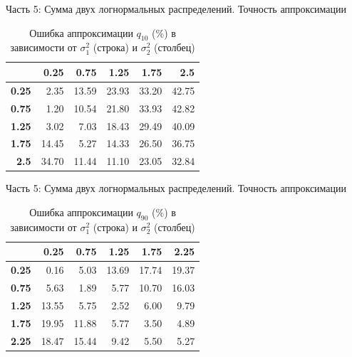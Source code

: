 \documentclass[ucs, notheorems, handout]{beamer}
\begin{document}
	\begin{frame}{Часть 5: Сумма двух логнормальных распределений. Точность аппроксимации}
		\begin{table}[ht]
			\centering
			\caption{Ошибка аппроксимации $q_{10}$ ($\%$) в зависимости от $\sigma_{1}^{2}$ (строка) и $\sigma_{2}^{2}$ (столбец)}
			\begin{tabular}{rrrrrr}
				\hline
				& \textbf{0.25} & \textbf{0.75} & \textbf{1.25} & \textbf{1.75} & \textbf{2.5} \\
				\hline
				\textbf{0.25} & 2.35 & 13.59 & 23.93 & 33.20 & 42.75 \\ 
				\textbf{0.75} & 1.20 & 10.54 & 21.80 & 33.93 & 42.82 \\ 
				\textbf{1.25} & 3.02 & 7.03 & 18.43 & 29.49 & 40.09 \\ 
				\textbf{1.75} & 14.45 & 5.27 & 14.33 & 26.50 & 36.75 \\ 
				\textbf{2.5} & 34.70 & 11.44 & 11.10 & 23.05 & 32.84 \\ 
				\hline
			\end{tabular}
		\end{table}
		
		
	\end{frame}
	
	\begin{frame}{Часть 5: Сумма двух логнормальных распределений. Точность аппроксимации}
		
		\begin{table}[ht]
			\centering
			\caption{Ошибка аппроксимации $q_{90}$ ($\%$) в зависимости от $\sigma_{1}^{2}$ (строка) и $\sigma_{2}^{2}$ (столбец) }
			\begin{tabular}{rrrrrr}
				\hline
				& \textbf{0.25} & \textbf{0.75} & \textbf{1.25} & \textbf{1.75} & \textbf{2.25} \\ 
				\hline
				\textbf{0.25} & 0.16 & 5.03 & 13.69 & 17.74 & 19.37 \\ 
				\textbf{0.75} & 5.63 & 1.89 & 5.77 & 10.70 & 16.03 \\ 
				\textbf{1.25} & 13.55 & 5.75 & 2.52 & 6.00 & 9.79 \\ 
				\textbf{1.75} & 19.95 & 11.88 & 5.77 & 3.50 & 4.89 \\ 
				\textbf{2.25} & 18.47 & 15.44 & 9.42 & 5.50 & 5.27 \\ 
				\hline
			\end{tabular}
		\end{table}
		
		
	\end{frame}
	
\end{document}
